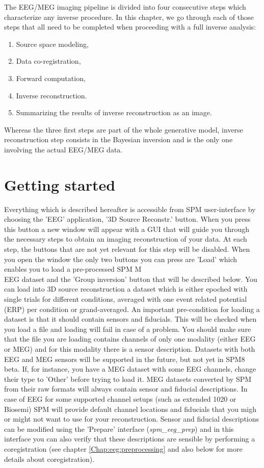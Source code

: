 The EEG/MEG imaging pipeline is divided into four consecutive steps which characterize
any inverse procedure. In this chapter, we go through each of those steps that all need 
to be completed when proceeding with a full inverse analysis:

\begin{enumerate}
    \item Source space modeling,
    \item Data co-registration,
    \item Forward computation,
    \item Inverse reconstruction.
    \item Summarizing the results of inverse reconstruction as an image.
\end{enumerate}

Whereas the three first steps are part of the whole generative model, inverse reconstruction
step consists in the Bayesian inversion and is the only one involving the actual EEG/MEG data.\\

\section{Getting started}

Everything which is described hereafter is accessible from SPM user-interface by choosing 
the 'EEG' application, '3D Source Reconstr.' button. When you press this button a new window
will appear with a GUI that will guide you through the necessary steps to obtain an imaging
reconstruction of your data. At each step, the buttons that are not yet relevant for this step
will be disabled. When you open the window the only two buttons you can press are 'Load' which enables you
to load a pre-processed SPM M\\EEG dataset and the 'Group inversion' button that will be described below. 
You can load into 3D source reconstruction a dataset which is either epoched with single trials for different
conditions, averaged with one event related potential (ERP) per condition or grand-averaged. An important pre-condition
for loading a dataset is that it should contain sensors and fiducials. This will be checked when you load a file
and loading will fail in case of a problem. You should make sure that the file you are loading
contains channels of only one modality (either EEG or MEG) and for this modality there is a sensor description. 
Datasets with both EEG and MEG sensors will be supported in the future, but not yet in SPM8 beta.
If, for instance, you have a MEG dataset with some EEG channels, change their type to 'Other' before trying to load it.
MEG datasets converted by SPM from their raw formats will always contain
sensor and fiducial descriptions. In case of EEG for some supported channel setups (such as extended 1020 or Biosemi)
SPM will provide default channel locations and fiducials that you migh or might not want to use for your reconstruction.
Sensor and fiducial descriptions can be modified using the 'Prepare' interface (\textit{spm\_eeg\_prep}) and in this
interface you can also verify that these descriptions are sensible by performing a coregistration (see chapter \ref{Chap:eeg:preprocessing} and also below for more details about coregistration). 

